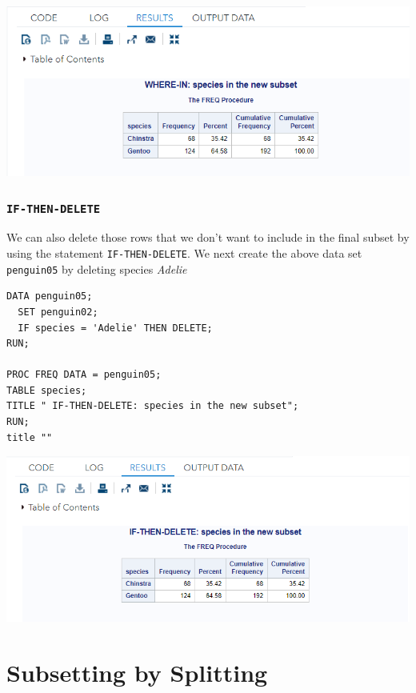 \documentclass[
]{book}
\begin{document}
\begin{center}\includegraphics[width=1\linewidth]{img07/w07-penguinSpeciesWHERE-IN} \end{center}

\hypertarget{if-then-delete}{%
\subsubsection{\texorpdfstring{\texttt{IF-THEN-DELETE}}{IF-THEN-DELETE}}\label{if-then-delete}}

We can also delete those rows that we don't want to include in the final subset by using the statement \texttt{IF-THEN-DELETE}. We next create the above data set \texttt{penguin05} by deleting species \emph{Adelie}

\begin{verbatim}
DATA penguin05;
  SET penguin02;
  IF species = 'Adelie' THEN DELETE;
RUN;

PROC FREQ DATA = penguin05;
TABLE species;
TITLE " IF-THEN-DELETE: species in the new subset";
RUN;
title ""
\end{verbatim}

\begin{center}\includegraphics[width=1\linewidth]{img07/w07-penguinSpeciesIF_THEN_DELETE} \end{center}

\hypertarget{subsetting-by-splitting}{%
\section{Subsetting by Splitting}\label{subsetting-by-splitting}}
\end{document}
